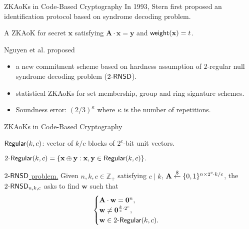 \begin{frame}{ZKAoKs in Code-Based Cryptography}
	In 1993, Stern first proposed an identification protocol \cite{Stern93} based on syndrome decoding problem.\pause
	
	A ZKAoK for secret $\mathbf{x}$ satisfying $\mathbf{A}\cdot\mathbf{x} = \mathbf{y}$ and $\mathsf{weight}(\mathbf{x}) = t$. \pause
	
	Nguyen et al. \cite{NguyenTWZ19, NguyenTWZ19eprint} proposed \pause
	\begin{itemize}
		\item a new commitment scheme based on hardness assumption of $2$-regular null syndrome decoding problem (${2\textsf{-}\mathsf{RNSD}}$).\pause
		\item statistical ZKAoKs for set membership, group and ring signature schemes.\pause 
		\item Soundness error: $(2/3)^\kappa$ where $\kappa$ is the number of repetitions.
	\end{itemize}
\end{frame}

\begin{frame}{ZKAoKs in Code-Based Cryptography}
	
		$\mathsf{Regular}(k,c)$: vector of $k/c$ blocks of $2^c$-bit unit vectors.\pause
	
		$2\textsf{-}\mathsf{Regular}(k,c) = \{\mathbf{x}\oplus\mathbf{y}: \mathbf{x}, \mathbf{y} \in \mathsf{Regular}(k, c)\}.$\pause
	
		\underline{${2\textsf{-}\mathsf{RNSD}}$ problem.}  Given $n, k, c \in \mathbb{Z}_+$ satisfying $c \mid k$, $\mathbf{A}\stackrel{\$}{\leftarrow}\{0,1\}^{n\times 2^c\cdot k/c}$, the ${2\textsf{-}\mathsf{RNSD}}_{n,k,c}$ asks to find $\mathbf{w}$ such that \pause$$\begin{cases}
			\mathbf{A}\cdot \mathbf{w} = \mathbf{0}^{n},\\
			\mathbf{w} \neq \mathbf{0}^{\frac{k}{c} \cdot 2^c}, \\
			\mathbf{w}\in2\textsf{-}\mathsf{Regular}(k,c).
		\end{cases}$$
\end{frame}
\begin{comment}
\begin{frame}{ZKAoKs in Code-Based Cryptography}
	\underline{Abstraction of Stern \cite{NguyenTWZ19}.} 
	
	{
		\setbeamercolor{block}{bg=red, fg=white}
		\begin{block}{\tiny 1. Commitment}
		Prover samples $\mathbf{r} \uniformly\{0,1\}^D$, $\phi \uniformly \PermutationSet$ 
		
		and randomness $\rho_1, \rho_2, \rho_3$:
		\begin{itemize}
			\item $C_1 = \CCom(\phi, \mathbf{M}\cdot\mathbf{r}; \rho_1)$.
			\item $C_2 = \CCom(\Gamma_\phi(\mathbf{r}); \rho_2)$.
			\item $C_3 = \CCom(\Gamma_\phi(\mathbf{w} \oplus \mathbf{r}); \rho_3)$.
		\end{itemize}
	\end{block}}
\end{frame}
\end{comment}


